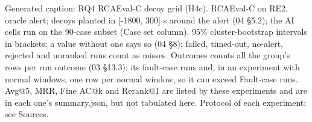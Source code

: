 \noindent Generated caption: RQ4 RCAEval-C decoy grid (H4c). RCAEval-C on RE2, oracle alert; decoys planted in [-1800, 300] s around the alert (04 \S{}5.2); the AI cells run on the 90-case subset (Case set column). 95\% cluster-bootstrap intervals in brackets; a value without one says so (04 \S{}8); failed, timed-out, no-alert, rejected and unranked runs count as misses. Outcomes counts all the group's rows per run outcome (03 \S{}13.3): its fault-case runs and, in an experiment with normal windows, one row per normal window, so it can exceed Fault-case runs. Avg@5, MRR, Fine AC@k and Rerank@1 are listed by these experiments and are in each one's summary.json, but not tabulated here. Protocol of each experiment: see Sources.\par
\endgroup
